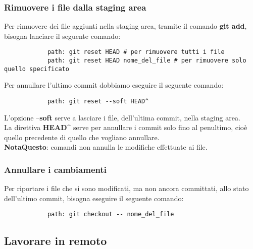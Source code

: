 		\subsubsection{Rimuovere i file dalla staging area} %
		\label{ssub:rimuovere_i_file_dalla_staging_area}
		Per rimuovere dei file aggiunti nella staging area, tramite il comando \textbf{git add}, bisogna lanciare il seguente comando:
			\begin{verbatim}
			path: git reset HEAD # per rimuovere tutti i file
			path: git reset HEAD nome_del_file # per rimuovere solo quello specificato
			\end{verbatim}
		\noindent
		Per annullare l'ultimo commit dobbiamo eseguire il seguente comando:
			\begin{verbatim}
			path: git reset --soft HEAD^
			\end{verbatim}
		\noindent
		L'opzione --\textbf{soft} serve a lasciare i file, dell'ultima commit, nella staging area. \\
		La direttiva \textbf{HEAD^} serve per annullare i commit solo fino al penultimo, cioè quello precedente di quello che vogliano annullare. \\
		\textbf{NotaQuesto}: comandi non annulla le modifiche effettuate ai file.
		
		
		\subsubsection{Annullare i cambiamenti} %
		\label{ssub:annullare_i_cambiamenti}
		Per riportare i file che si sono modificati, ma non ancora committati, allo stato dell'ultimo commit, bisogna eseguire il seguente comando:
			\begin{verbatim}
			path: git checkout -- nome_del_file
			\end{verbatim}
	
	
	\subsection{Lavorare in remoto} %
	\label{sub:lavorare_in_remoto}
	

\newpage \clearpage

